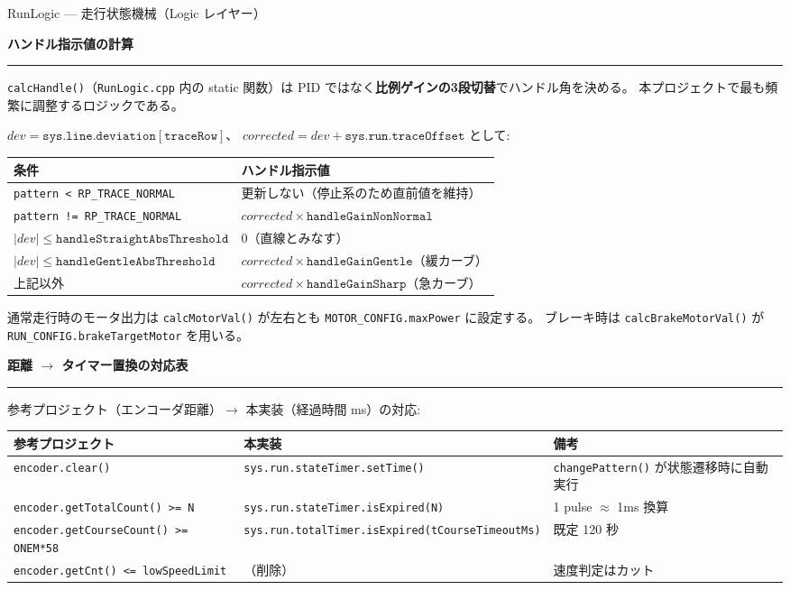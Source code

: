 \documentclass[a4paper,11pt,dvipdfmx]{jsarticle}
\makeatletter
\newcommand{\apisection}[1]{%
  \par\addvspace{4mm}%
  {\normalsize\bfseries\color{headerblue} #1}%
  \par\vspace{-1mm}%
  {\color{accentblue!40}\rule{\linewidth}{0.5pt}}%
  \par\nobreak\vspace{2mm}%
  \@afterheading
}
\makeatother
\begin{document}
\begin{apibox}{RunLogic --- 走行状態機械（Logic レイヤー）}
\apisection{ハンドル指示値の計算}

\texttt{calcHandle()}（\texttt{RunLogic.cpp} 内の static 関数）は
PID ではなく\textbf{比例ゲインの3段切替}でハンドル角を決める。
本プロジェクトで最も頻繁に調整するロジックである。

\vspace{2mm}
$\mathit{dev} = \mathtt{sys.line.deviation[traceRow]}$、
$\mathit{corrected} = \mathit{dev} + \mathtt{sys.run.traceOffset}$ として:

\begin{tabularx}{\textwidth}{l X}
\toprule
\textbf{条件} & \textbf{ハンドル指示値} \\
\midrule
\texttt{pattern < RP\_TRACE\_NORMAL} & 更新しない（停止系のため直前値を維持） \\
\texttt{pattern != RP\_TRACE\_NORMAL} & $\mathit{corrected} \times \mathtt{handleGainNonNormal}$ \\
$|\mathit{dev}| \leq \mathtt{handleStraightAbsThreshold}$ & 0（直線とみなす） \\
$|\mathit{dev}| \leq \mathtt{handleGentleAbsThreshold}$   & $\mathit{corrected} \times \mathtt{handleGainGentle}$（緩カーブ） \\
上記以外 & $\mathit{corrected} \times \mathtt{handleGainSharp}$（急カーブ） \\
\bottomrule
\end{tabularx}

\vspace{2mm}
通常走行時のモータ出力は \texttt{calcMotorVal()} が左右とも
\texttt{MOTOR\_CONFIG.maxPower} に設定する。
ブレーキ時は \texttt{calcBrakeMotorVal()} が \texttt{RUN\_CONFIG.brakeTargetMotor} を用いる。

\apisection{距離 $\rightarrow$ タイマー置換の対応表}

参考プロジェクト（エンコーダ距離）$\rightarrow$ 本実装（経過時間 ms）の対応:

\begin{tabularx}{\textwidth}{l l X}
\toprule
\textbf{参考プロジェクト} & \textbf{本実装} & \textbf{備考} \\
\midrule
\texttt{encoder.clear()} & \texttt{sys.run.stateTimer.setTime()} & \texttt{changePattern()} が状態遷移時に自動実行 \\
\texttt{encoder.getTotalCount() >= N} & \texttt{sys.run.stateTimer.isExpired(N)} & 1 pulse $\approx$ 1ms 換算 \\
\texttt{encoder.getCourseCount() >= ONEM*58} & \texttt{sys.run.totalTimer.isExpired(tCourseTimeoutMs)} & 既定 120 秒 \\
\texttt{encoder.getCnt() <= lowSpeedLimit} & （削除） & 速度判定はカット \\
\bottomrule
\end{tabularx}


\end{apibox}
\end{document}
